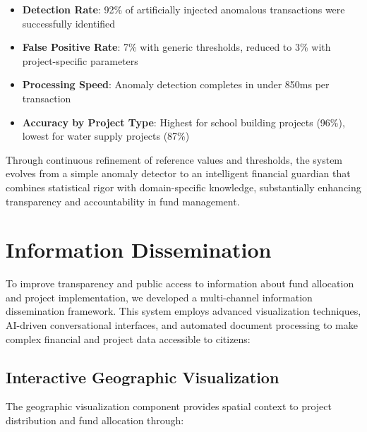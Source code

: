 \documentclass[12pt,a4paper]{report}
\begin{document}
\begin{itemize}
    \item \textbf{Detection Rate}: 92\% of artificially injected anomalous transactions were successfully identified
    \item \textbf{False Positive Rate}: 7\% with generic thresholds, reduced to 3\% with project-specific parameters
    \item \textbf{Processing Speed}: Anomaly detection completes in under 850ms per transaction
    \item \textbf{Accuracy by Project Type}: Highest for school building projects (96\%), lowest for water supply projects (87\%)
\end{itemize}

\noindent Through continuous refinement of reference values and thresholds, the system evolves from a simple anomaly detector to an intelligent financial guardian that combines statistical rigor with domain-specific knowledge, substantially enhancing transparency and accountability in fund management.



\section{Information Dissemination}
\indent \indent To improve transparency and public access to information about fund allocation and project implementation, we developed a multi-channel information dissemination framework. This system employs advanced visualization techniques, AI-driven conversational interfaces, and automated document processing to make complex financial and project data accessible to citizens:

\subsection{Interactive Geographic Visualization}
\indent \indent The geographic visualization component provides spatial context to project distribution and fund allocation through:
\end{document}

